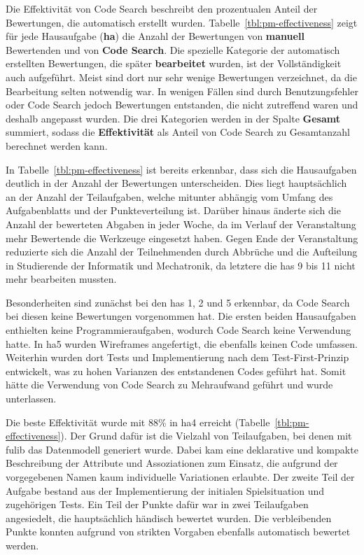 Die Effektivität von Code Search beschreibt den prozentualen Anteil der Bewertungen, die automatisch erstellt wurden.
Tabelle~\ref{tbl:pm-effectiveness} zeigt für jede Hausaufgabe (\textbf{\acs{ha}}) die Anzahl der Bewertungen von \textbf{manuell} Bewertenden und von \textbf{Code Search}.
Die spezielle Kategorie der automatisch erstellten Bewertungen, die später \textbf{bearbeitet} wurden, ist der Vollständigkeit auch aufgeführt.
Meist sind dort nur sehr wenige Bewertungen verzeichnet, da die Bearbeitung selten notwendig war.
In wenigen Fällen sind durch Benutzungsfehler oder Code Search jedoch Bewertungen entstanden, die nicht zutreffend waren und deshalb angepasst wurden.
Die drei Kategorien werden in der Spalte \textbf{Gesamt} summiert, sodass die \textbf{Effektivität} als Anteil von Code Search zu Gesamtanzahl berechnet werden kann.

In Tabelle~\ref{tbl:pm-effectiveness} ist bereits erkennbar, dass sich die Hausaufgaben deutlich in der Anzahl der Bewertungen unterscheiden.
Dies liegt hauptsächlich an der Anzahl der Teilaufgaben, welche mitunter abhängig vom Umfang des Aufgabenblatts und der Punkteverteilung ist.
Darüber hinaus änderte sich die Anzahl der bewerteten Abgaben in jeder Woche, da im Verlauf der Veranstaltung mehr Bewertende die Werkzeuge eingesetzt haben.
Gegen Ende der Veranstaltung reduzierte sich die Anzahl der Teilnehmenden durch Abbrüche und die Aufteilung in Studierende der Informatik und Mechatronik, da letztere die \acp{ha} 9 bis 11 nicht mehr bearbeiten mussten.

Besonderheiten sind zunächst bei den \acp{ha} 1, 2 und 5 erkennbar, da Code Search bei diesen keine Bewertungen vorgenommen hat.
Die ersten beiden Hausaufgaben enthielten keine Programmieraufgaben, wodurch Code Search keine Verwendung hatte.
In \ac{ha}5 wurden Wireframes angefertigt, die ebenfalls keinen Code umfassen.
Weiterhin wurden dort Tests und Implementierung nach dem Test-First-Prinzip entwickelt, was zu hohen Varianzen des entstandenen Codes geführt hat.
Somit hätte die Verwendung von Code Search zu Mehraufwand geführt und wurde unterlassen.

Die beste Effektivität wurde mit 88\% in \ac{ha}4 erreicht (Tabelle~\ref{tbl:pm-effectiveness}).
Der Grund dafür ist die Vielzahl von Teilaufgaben, bei denen mit fulib das Datenmodell generiert wurde.
Dabei kam eine deklarative und kompakte Beschreibung der Attribute und Assoziationen zum Einsatz, die aufgrund der vorgegebenen Namen kaum individuelle Variationen erlaubte.
Der zweite Teil der Aufgabe bestand aus der Implementierung der initialen Spielsituation und zugehörigen Tests.
Ein Teil der Punkte dafür war in zwei Teilaufgaben angesiedelt, die hauptsächlich händisch bewertet wurden.
Die verbleibenden Punkte konnten aufgrund von strikten Vorgaben ebenfalls automatisch bewertet werden.

